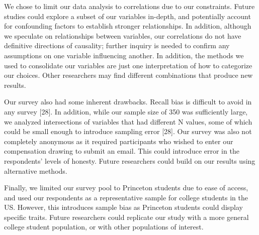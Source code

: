 We chose to limit our data
analysis to correlations due to our constraints. Future studies could explore
a subset of our variables in-depth, and potentially account for confounding
factors to establish stronger relationships. In addition, although we
speculate on relationships between variables, our correlations do not have
definitive directions of causality; further inquiry is needed to confirm any
assumptions on one variable influencing another. In addition, the methods we
used to consolidate our variables are just one interpretation of how to
categorize our choices. Other researchers may find different combinations that
produce new results.

Our survey also had some inherent drawbacks. Recall bias is difficult to avoid
in any survey [28]. In addition, while our sample size of 350 was sufficiently
large, we analyzed intersections of variables that had different N values,
some of which could be small enough to introduce sampling error [28]. Our
survey was also not completely anonymous as it required participants who
wished to enter our compensation drawing to submit an email. This could
introduce error in the respondents' levels of honesty. Future researchers
could build on our results using alternative methods.

Finally, we limited our survey pool to Princeton students due to ease of
access, and used our respondents as a representative sample for college
students in the US. However, this introduces sample bias as Princeton students
could display specific traits. Future researchers could replicate our study
with a more general college student population, or with other populations of
interest.
